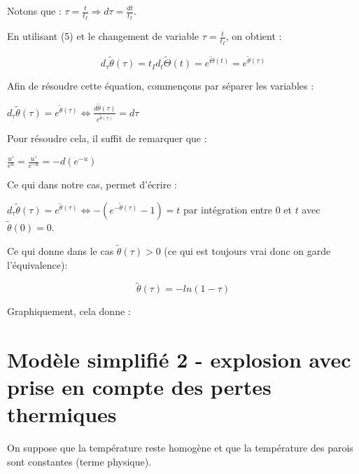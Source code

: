 \documentclass[10pt,a4paper]{report}
\begin{document}
Notons que : $\tau = \frac{t}{t_I} \Rightarrow d\tau = \frac{dt}{t_I} $.

En utilisant (5) et le changement de variable $\tau = \frac{t}{t_I}$, on obtient : 

$$ d_{\tau}\tilde{\theta}(\tau) = t_I d_{t}\tilde{\Theta}(t) = e^{\tilde{\Theta}(t)} = e^{\tilde{\theta}(\tau)} $$

Afin de résoudre cette équation, commençons par séparer les variables : 

$ d_{\tau}\tilde{\theta}(\tau) = e^{\tilde{\theta}(\tau)} \Leftrightarrow \frac{d\tilde{\theta}(\tau)}{e^{\tilde{\theta}(\tau)} } = d\tau $

Pour résoudre cela, il suffit de remarquer que :

$ \frac{u'}{e^u} = \frac{u'}{e^{-u}} = - d(e^{-u})$

Ce qui dans notre cas, permet d'écrire :

$ d_{\tau}\tilde{\theta}(\tau) = e^{\tilde{\theta}(\tau)} \Leftrightarrow  - (e^{-\tilde{\theta}(\tau)} - 1) = t $ par intégration entre $0$ et $t$ avec $\tilde{\theta}(0) = 0$.

Ce qui donne dans le cas $\tilde{\theta}(\tau) > 0$ (ce qui est toujours vrai donc on garde l'équivalence):  

$$\tilde{\theta}(\tau) = - ln(1-\tau)$$

Graphiquement, cela donne :




\section{Modèle simplifié 2 - explosion avec prise en compte des pertes thermiques}

On suppose que la température reste homogène et que la température des parois sont constantes (terme physique).
\end{document}
